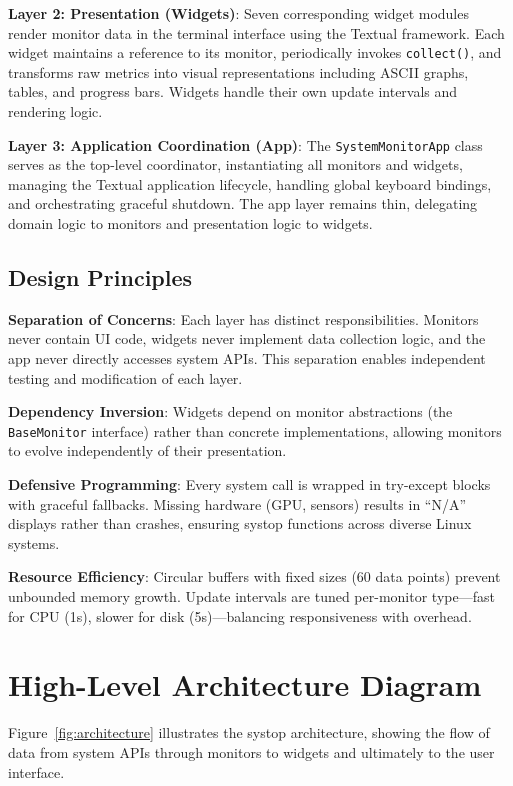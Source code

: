\documentclass[12pt,a4paper,oneside]{report}
\begin{document}
\textbf{Layer 2: Presentation (Widgets)}: Seven corresponding widget modules render monitor data in the terminal interface using the Textual framework. Each widget maintains a reference to its monitor, periodically invokes \texttt{collect()}, and transforms raw metrics into visual representations including ASCII graphs, tables, and progress bars. Widgets handle their own update intervals and rendering logic.

\textbf{Layer 3: Application Coordination (App)}: The \texttt{SystemMonitorApp} class serves as the top-level coordinator, instantiating all monitors and widgets, managing the Textual application lifecycle, handling global keyboard bindings, and orchestrating graceful shutdown. The app layer remains thin, delegating domain logic to monitors and presentation logic to widgets.

\subsection{Design Principles}

\textbf{Separation of Concerns}: Each layer has distinct responsibilities. Monitors never contain UI code, widgets never implement data collection logic, and the app never directly accesses system APIs. This separation enables independent testing and modification of each layer.

\textbf{Dependency Inversion}: Widgets depend on monitor abstractions (the \texttt{BaseMonitor} interface) rather than concrete implementations, allowing monitors to evolve independently of their presentation.

\textbf{Defensive Programming}: Every system call is wrapped in try-except blocks with graceful fallbacks. Missing hardware (GPU, sensors) results in ``N/A'' displays rather than crashes, ensuring systop functions across diverse Linux systems.

\textbf{Resource Efficiency}: Circular buffers with fixed sizes (60 data points) prevent unbounded memory growth. Update intervals are tuned per-monitor type---fast for CPU (1s), slower for disk (5s)---balancing responsiveness with overhead.

\section{High-Level Architecture Diagram}
\label{sec:architecture-diagram}

Figure~\ref{fig:architecture} illustrates the systop architecture, showing the flow of data from system APIs through monitors to widgets and ultimately to the user interface.
\end{document}
